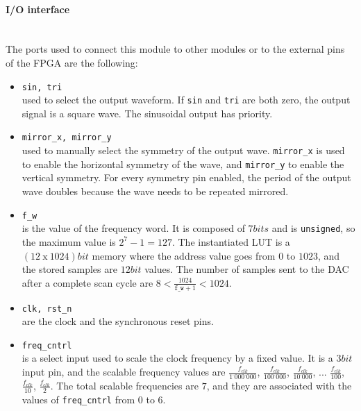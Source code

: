 \paragraph{I/O interface} \quad \\
The ports used to connect this module to other modules or to the external pins of the FPGA are the following:

\begin{itemize}

    \item \texttt{sin, tri} \\
    used to select the output waveform. If \texttt{sin} and \texttt{tri} are both zero, the output signal is a square wave. The sinusoidal output has priority.
    
    \item \texttt{mirror\_x, mirror\_y} \\
    used to manually select the symmetry of the output wave. \texttt{mirror\_x} is used to enable the horizontal symmetry of the wave, and \texttt{mirror\_y} to enable the vertical symmetry. For every symmetry pin enabled, the period of the output wave doubles because the wave needs to be repeated mirrored.
    
    \item \texttt{f\_w} \\
    is the value of the frequency word. It is composed of \(7bits\) and is 
    \texttt{unsigned}, so the maximum value is \(2^7 - 1 = 127\). The instantiated LUT is a \((12 \ \text{x} \ 1024)bit\) memory where the address value goes from \(0\) to \(1023\), and the stored samples are \(12bit\) values. The number of samples sent to the DAC after a complete scan cycle are \( 8 < \frac{1024}{\texttt{f\_w} + 1} < 1024 \).
    
    \item \texttt{clk, rst\_n} \\
    are the clock and the synchronous reset pins.
    
    \item \texttt{freq\_cntrl} \\
    is a select input used to scale the clock frequency by a fixed value.
    It is a \(3bit\) input pin, and the scalable frequency values are \(\frac{f_{clk}}{1^. 000^. 000}\), \(\frac{f_{clk}}{100^. 000}\), \(\frac{f_{clk}}{10^. 000}\), ... \(\frac{f_{clk}}{100}\), \(\frac{f_{clk}}{10}\), \(\frac{f_{clk}}{2}\).
    The total scalable frequencies are \(7\), and they are associated with the values of \texttt{freq\_cntrl} from \(0\) to \(6\).


\end{itemize}
